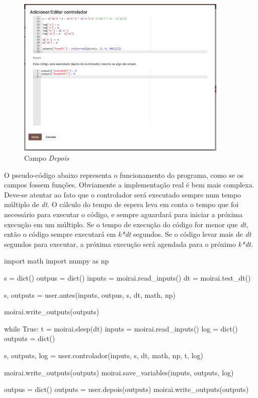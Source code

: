 \begin{figure}[ht!]
    \centering
    \includegraphics[width=0.9\textwidth]{imgs/control5}
    \caption[Campo \textit{Depois}]{Campo \textit{Depois}}%
    \label{fig:control5}
\end{figure}

O pseudo-código abaixo representa o funcionamento do programa, como se os campos
fossem funções. Obviamente a implementação real é bem mais complexa. Deve-se
atentar ao fato que o controlador será executado sempre num tempo múltiplo de
\textit{dt}. O cálculo do tempo de espera leva em conta o tempo que foi
necessário para executar o código, e sempre aguardará para iniciar a próxima
execução em um múltiplo. Se o tempo de execução do código for menor que
\textit{dt}, então o código sempre executará em \textit{k*dt} segundos. Se o
código levar mais de \textit{dt} segundos para executar, a próxima execução será
agendada para o próximo \textit{k*dt}.

\newpage{}
\begin{pythoncode}
    import math
    import numpy as np

    s = dict()
    outpus = dict()
    inputs = moirai.read_inputs()
    dt = moirai.test_dt()

    s, outputs = user.antes(inputs, outpus, s, dt, math, np)
    
    moirai.write_outputs(outputs)
    
    while True:
        t = moirai.sleep(dt)
        inputs = moirai.read_inputs()
        log = dict()
        outputs = dict()
        
        s, outputs, log = user.controlador(inputs, s, dt, math, np, t, log)

        moirai.write_outputs(outputs)
        moirai.save_variables(inputs, outputs, log)
    
    outpus = dict()
    outputs = user.depois(outputs)
    moirai.write_outputs(outputs)
\end{pythoncode}
